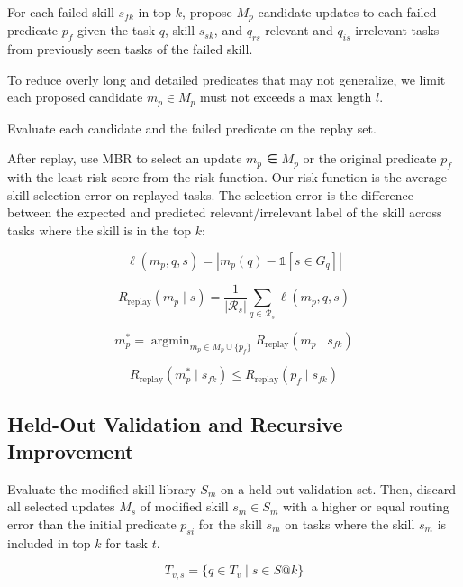 For each failed skill \(s_{fk}\) in top \(k\), propose \(M_{p}\) candidate updates to each failed predicate \(p_{f}\) given the task \(q\), skill \(s_{sk}\), and \(q_{rs}\) relevant and \(q_{is}\) irrelevant tasks from previously seen tasks of the failed skill.

To reduce overly long and detailed predicates that may not generalize, we limit each proposed candidate \(m_{p} \in M_{p}\) must not exceeds a max length \(l\).

Evaluate each candidate and the failed predicate on the replay set.

After replay, use MBR to select an update \(m_{p}\) ∈ \(M_{p}\) or the original predicate \(p_{f}\) with the least risk score from the risk function. Our risk function is the average skill selection error on replayed tasks. The selection error is the difference between the expected and predicted relevant/irrelevant label of the skill across tasks where the skill is in the top \(k\):

\[\ell(m_p,q,s)=|m_p(q)-\mathds{1}[s\in G_q]|\]

\[R_{\mathrm{replay}}(m_p\mid s)=\frac{1}{|\mathcal{R}_s|}\sum_{q\in\mathcal{R}_s}\ell(m_p,q,s)\]

\[m_p^*=\mathop{\arg\min}_{m_p\in M_p\cup\{p_f\}} R_{\mathrm{replay}}(m_p\mid s_{fk})\]

\[R_{\mathrm{replay}}(m_p^*\mid s_{fk})\leq R_{\mathrm{replay}}(p_f\mid s_{fk})\]

\subsection{Held-Out Validation and Recursive Improvement}

Evaluate the modified skill library \(S_{m}\) on a held-out validation set. Then, discard all selected updates \(M_{s}\) of modified skill \(s_{m} \in S_{m}\) with a higher or equal routing error than the initial predicate \(p_{si}\) for the skill \(s_{m}\) on tasks where the skill \(s_{m}\) is included in top \(k\) for task \(t\).

\[T_{v,s}=\{q\in T_v\mid s\in S@k\}\]

